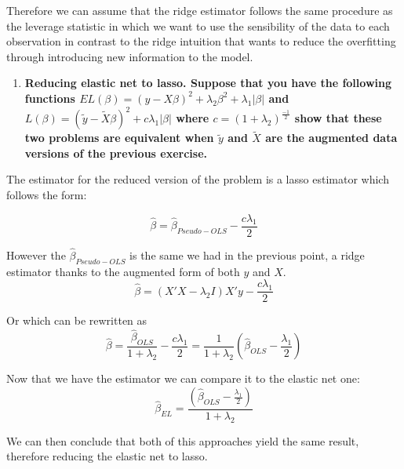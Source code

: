 \documentclass[12pt,onecolumn]{article}
\begin{document}
Therefore we can assume that the ridge estimator follows the same procedure as the leverage statistic in which we want to use the sensibility of the data to each observation in contrast to the ridge intuition that wants to reduce the overfitting through introducing new information to the model.
\begin{enumerate}[resume]    
    \item \bf{Reducing elastic net to lasso. Suppose that you have the following functions $EL(\beta) = (y-X\beta)^2+ \lambda_2 \beta^2+ \lambda_1|\beta|$ and $L(\beta) = (\tilde{y}-\tilde{X}\beta)^2+ c \lambda_1|\beta|$ where $c=(1+\lambda_2)^{\frac{-1}{2}}$ show that these two problems are equivalent when $\tilde{y}$ and $\tilde{X}$ are the augmented data versions of the previous exercise.}
\end{enumerate}

The estimator for the reduced version of the problem is a lasso estimator which follows the form:

\begin{equation*}
    \hat{\beta}=\hat{\beta}_{Pseudo-OLS}-\frac{c\lambda_1}{2}
\end{equation*}

However the $\hat{\beta}_{Pseudo-OLS}$ is the same we had in the previous point, a ridge estimator thanks to the augmented form of both $y$ and $X$.
\begin{equation*}
    \hat{\beta}=(X'X-\lambda_2{I})X'y-\frac{c\lambda_1}{2}
\end{equation*}

Or which can be rewritten as
\begin{equation*}
    \hat{\beta}=\frac{\hat{\beta}_{OLS}}{1+\lambda_2}-\frac{c\lambda_1}{2}=\frac{1}{1+\lambda_2}\left(\hat{\beta}_{OLS}-\frac{\lambda_1}{2}\right)
\end{equation*}

Now that we have the estimator we can compare it to the elastic net one:
\begin{equation*}
    \hat{\beta}_{EL}=\frac{\left(\hat{\beta}_{OLS}-\frac{\lambda_1}{2}\right)}{1+\lambda_2}
\end{equation*}

We can then conclude that both of this approaches yield the same result, therefore reducing the elastic net to lasso.
\end{document}
